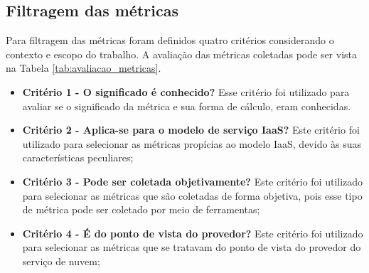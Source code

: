 \documentclass[conference]{IEEEtran}
\begin{document}
     
  \subsection{Filtragem das métricas}
  
      Para filtragem das métricas foram definidos quatro critérios considerando o contexto e escopo do trabalho. A avaliação das
      métricas coletadas pode ser vista na Tabela \ref{tab:avaliacao_metricas}.
   
	\begin{itemize}
	 \item \textbf{Critério 1 - O significado é conhecido?}
	    \subitem Esse critério foi utilizado para avaliar se o significado da métrica e sua forma de cálculo, eram conhecidas.
	 \item \textbf{Critério 2 - Aplica-se para o modelo de serviço IaaS?}
	    \subitem Este critério foi utilizado para selecionar as métricas propícias ao modelo IaaS, 
	    devido às suas características peculiares;
	 \item \textbf{Critério 3 - Pode ser coletada objetivamente?}
	    \subitem Este critério foi utilizado para selecionar as métricas que são coletadas de forma objetiva, pois esse tipo
	    de métrica pode ser coletado por meio de ferramentas;
	 \item \textbf{Critério 4 - É do ponto de vista do provedor?}
	    \subitem Este critério foi utilizado para selecionar as métricas que se tratavam do ponto de vista do provedor do serviço
	    de nuvem;
	\end{itemize}
	
\end{document}
